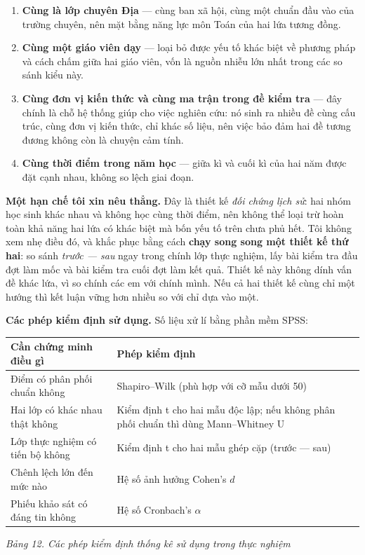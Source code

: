 \begin{enumerate}[label=(\arabic*), leftmargin=1.2cm, itemsep=3pt]
  \item \textbf{Cùng là lớp chuyên Địa} --- cùng ban xã hội, cùng một chuẩn đầu
        vào của trường chuyên, nên mặt bằng năng lực môn Toán của hai lứa tương
        đồng.
  \item \textbf{Cùng một giáo viên dạy} --- loại bỏ được yếu tố khác biệt về
        phương pháp và cách chấm giữa hai giáo viên, vốn là nguồn nhiễu lớn nhất
        trong các so sánh kiểu này.
  \item \textbf{Cùng đơn vị kiến thức và cùng ma trận trong đề kiểm tra} --- đây
        chính là chỗ hệ thống giúp cho việc nghiên cứu: nó sinh ra nhiều đề cùng
        cấu trúc, cùng đơn vị kiến thức, chỉ khác số liệu, nên việc bảo đảm hai
        đề tương đương không còn là chuyện cảm tính.
  \item \textbf{Cùng thời điểm trong năm học} --- giữa kì và cuối kì của hai năm
        được đặt cạnh nhau, không so lệch giai đoạn.
\end{enumerate}

\textbf{Một hạn chế tôi xin nêu thẳng.} Đây là thiết kế \textit{đối chứng lịch
sử}: hai nhóm học sinh khác nhau và không học cùng thời điểm, nên không thể loại
trừ hoàn toàn khả năng hai lứa có khác biệt mà bốn yếu tố trên chưa phủ hết. Tôi
không xem nhẹ điều đó, và khắc phục bằng cách \textbf{chạy song song một thiết
kế thứ hai}: so sánh \textit{trước --- sau} ngay trong chính lớp thực nghiệm,
lấy bài kiểm tra đầu đợt làm mốc và bài kiểm tra cuối đợt làm kết quả. Thiết kế
này không dính vấn đề khác lứa, vì so chính các em với chính mình. Nếu cả hai
thiết kế cùng chỉ một hướng thì kết luận vững hơn nhiều so với chỉ dựa vào một.

\textbf{Các phép kiểm định sử dụng.} Số liệu xử lí bằng phần mềm SPSS:

\begin{center}
\begin{tabular}{|p{6.2cm}|p{7.6cm}|}
\hline
\textbf{Cần chứng minh điều gì} & \textbf{Phép kiểm định} \\ \hline
Điểm có phân phối chuẩn không &
Shapiro--Wilk (phù hợp với cỡ mẫu dưới 50) \\ \hline
Hai lớp có khác nhau thật không &
Kiểm định t cho hai mẫu độc lập; nếu không phân phối chuẩn thì dùng
Mann--Whitney U \\ \hline
Lớp thực nghiệm có tiến bộ không &
Kiểm định t cho hai mẫu ghép cặp (trước --- sau) \\ \hline
Chênh lệch lớn đến mức nào &
Hệ số ảnh hưởng Cohen's $d$ \\ \hline
Phiếu khảo sát có đáng tin không &
Hệ số Cronbach's $\alpha$ \\ \hline
\end{tabular}
\end{center}
\textit{Bảng 12. Các phép kiểm định thống kê sử dụng trong thực nghiệm}

